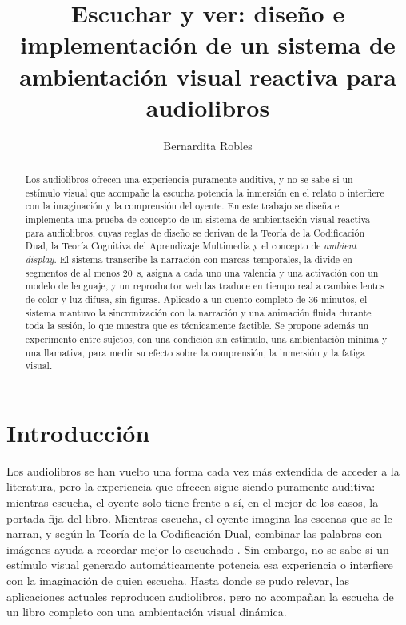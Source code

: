 \documentclass[journal]{IEEEtran}
\begin{document}
 
\title{Escuchar y ver: diseño e implementación de un sistema de ambientación visual reactiva para audiolibros}
\author{Bernardita Robles}
 
\maketitle
 
\begin{abstract}
Los audiolibros ofrecen una experiencia puramente auditiva, y no se sabe si un estímulo visual que acompañe la escucha potencia la inmersión en el relato o interfiere con la imaginación y la comprensión del oyente. En este trabajo se diseña e implementa una prueba de concepto de un sistema de ambientación visual reactiva para audiolibros, cuyas reglas de diseño se derivan de la Teoría de la Codificación Dual, la Teoría Cognitiva del Aprendizaje Multimedia y el concepto de \textit{ambient display}. El sistema transcribe la narración con marcas temporales, la divide en segmentos de al menos 20~s, asigna a cada uno una valencia y una activación con un modelo de lenguaje, y un reproductor web las traduce en tiempo real a cambios lentos de color y luz difusa, sin figuras. Aplicado a un cuento completo de 36 minutos, el sistema mantuvo la sincronización con la narración y una animación fluida durante toda la sesión, lo que muestra que es técnicamente factible. Se propone además un experimento entre sujetos, con una condición sin estímulo, una ambientación mínima y una llamativa, para medir su efecto sobre la comprensión, la inmersión y la fatiga visual.
\end{abstract}
 
\section{Introducción}
Los audiolibros se han vuelto una forma cada vez más extendida de acceder a la literatura, pero la experiencia que ofrecen sigue siendo puramente auditiva: mientras escucha, el oyente solo tiene frente a sí, en el mejor de los casos, la portada fija del libro. Mientras escucha, el oyente imagina las escenas que se le narran, y según la Teoría de la Codificación Dual, combinar las palabras con imágenes ayuda a recordar mejor lo escuchado \cite{paivio1991}. Sin embargo, no se sabe si un estímulo visual generado automáticamente potencia esa experiencia o interfiere con la imaginación de quien escucha. Hasta donde se pudo relevar, las aplicaciones actuales reproducen audiolibros, pero no acompañan la escucha de un libro completo con una ambientación visual dinámica.
\end{document}
